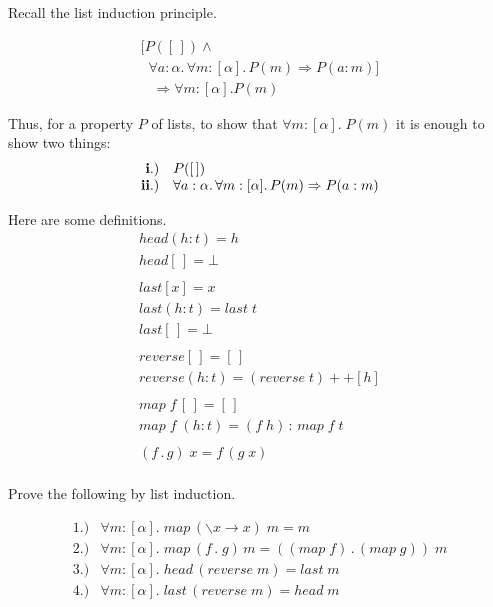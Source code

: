 \documentclass[11pt]{article}
\begin{document}

Recall the list induction principle.

\[\begin{array}{l}

[P([\,]) \wedge \\
\;\;\forall a:\alpha.\, \forall m:[\alpha].\, P(m) \Rightarrow P(a:m)] \\
\;\;\; \Rightarrow \forall{}m:[\alpha]. P(m)
\end{array}\]

Thus, for a property $P$ of lists, to show that $\forall{}m:[\alpha].\; P(m)$
it is enough to show two things:
\[\begin{array}{rl}
{\bf{i.)}} & P([\,]) \\
{\bf{ii.)}} & \forall a:\alpha.\, \forall m:[\alpha].\, P(m) \Rightarrow P(a:m)\\
\end{array}\]

Here are some definitions.
\[\begin{array}{l}

head (h:t) = h \\
head [\,] = \bot \\
\ \\
last [x] = x \\
last (h:t) = last \; t \\
last [\,] = \bot \\
\ \\
reverse [\,] = [\,]\\
reverse (h:t) = (reverse \; t ) ++ [h] \\
\ \\
map\; f\, [\,] = [\,] \\
map \; f \; (h:t) = (f\; h)\, :\, map \; f \; t \\
\ \\
(f\, .\, g)\; x = f\, (g\; x)\\

\end{array}\]


Prove the following by list induction.

\[\begin{array}{ll}
1.) & \forall{}m \!:\![\alpha].\; map \,(\backslash x \rightarrow x)\; m = m \\
2.) & \forall{}m \!:\![\alpha].\; map \,(f\, .\; g)\, m = ((map\; f)\, .\, (map\; g))\; m\\
3.) & \forall{}m \!:\![\alpha].\; head\, (reverse \; m) = last \; m \\
4.) & \forall{}m \!:\![\alpha].\; last\, (reverse \; m) = head \; m
\end{array}
\]
\end{document}
